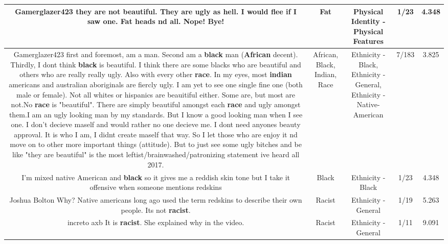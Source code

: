 \documentclass[11pt]{article}
\newlength\mylength
\begin{document}
\begin{center}
\begin{longtable}{|C{.65\mylength}|C{.30\mylength}|C{.12\mylength}|C{.12\mylength}|C{.12\mylength}|}
  \small Gamerglazer423 they are not beautiful. They are ugly as hell. I would flee if I saw one. \textbf{Fat} heads nd all. Nope! Bye!\normalsize   & Fat & Physical Identity - Physical Features & 1/23 & 4.348 \\  \hline
  \small Gamerglazer423 first and foremost, am a man. Second am a \textbf{black} man (\textbf{African} decent). Thirdly, I dont think \textbf{black} is beautiful. I think there are some blacks who are beautiful and others who are really really ugly. Also with every other \textbf{race}. In my eyes, most \textbf{indian} americans and australian aboriginals are fiercly ugly. I am yet to see one single fine one (both male or female). Not all whites or hispanics are beauitiful either. Some are, but most are not.No \textbf{race} is "beautiful". There are simply beautiful amongst each \textbf{race} and ugly amongst them.I am an ugly looking man by my standards. But I know a good looking man when I see one. I don't decieve maself and would rather no one decieve me. I dont need anyones beauty approval. It is who I am, I didnt create maself that way. So I let those who are enjoy it nd move on to other more important things (attitude). But to just see some ugly bitches and be like "they are beautiful" is the most leftist/brainwashed/patronizing statement ive heard all 2017.\normalsize   & African, Black, Indian, Race & Ethnicity - Black, Ethnicity - General, Ethnicity - Native-American & 7/183 & 3.825 \\  \hline
  \small I'm mixed native American and \textbf{black} so it gives me a reddish skin tone but I take it offensive when someone mentions redskins\normalsize   & Black & Ethnicity - Black & 1/23 & 4.348 \\  \hline
  \small Joshua Bolton Why? Native americans long ago used the term redskins to describe their own people. Its not \textbf{racist}.\normalsize   & Racist & Ethnicity - General & 1/19 & 5.263 \\  \hline
  \small increto axb It is \textbf{racist}. She explained why in the video.\normalsize   & Racist & Ethnicity - General & 1/11 & 9.091 \\  \hline

\end{longtable}
\end{center}
\end{document}
